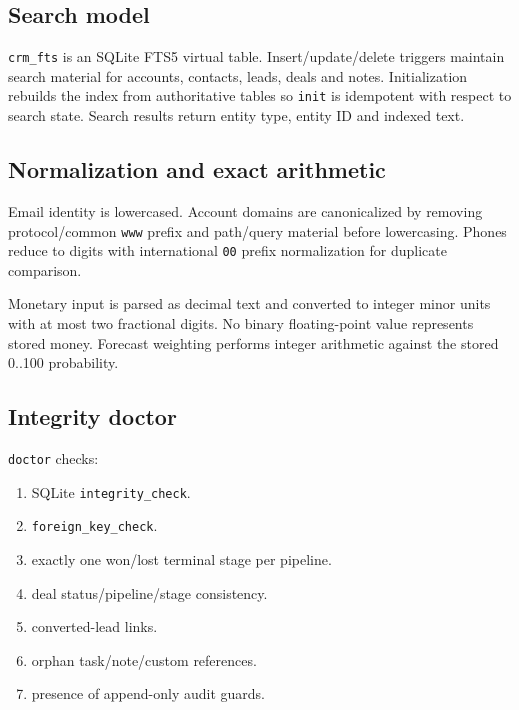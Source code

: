 \documentclass[
]{article}
\providecommand{\tightlist}{%
  \setlength{\itemsep}{0pt}\setlength{\parskip}{0pt}}
\begin{document}
\subsection{Search model}\label{search-model}

\texttt{crm\_fts} is an SQLite FTS5 virtual table. Insert/update/delete
triggers maintain search material for accounts, contacts, leads, deals
and notes. Initialization rebuilds the index from authoritative tables
so \texttt{init} is idempotent with respect to search state. Search
results return entity type, entity ID and indexed text.

\subsection{Normalization and exact
arithmetic}\label{normalization-and-exact-arithmetic}

Email identity is lowercased. Account domains are canonicalized by
removing protocol/common \texttt{www} prefix and path/query material
before lowercasing. Phones reduce to digits with international
\texttt{00} prefix normalization for duplicate comparison.

Monetary input is parsed as decimal text and converted to integer minor
units with at most two fractional digits. No binary floating-point value
represents stored money. Forecast weighting performs integer arithmetic
against the stored 0..100 probability.

\subsection{Integrity doctor}\label{integrity-doctor}

\texttt{doctor} checks:

\begin{enumerate}
\def\labelenumi{\arabic{enumi}.}
\tightlist
\item
  SQLite \texttt{integrity\_check}.
\item
  \texttt{foreign\_key\_check}.
\item
  exactly one won/lost terminal stage per pipeline.
\item
  deal status/pipeline/stage consistency.
\item
  converted-lead links.
\item
  orphan task/note/custom references.
\item
  presence of append-only audit guards.
\end{enumerate}
\end{document}
